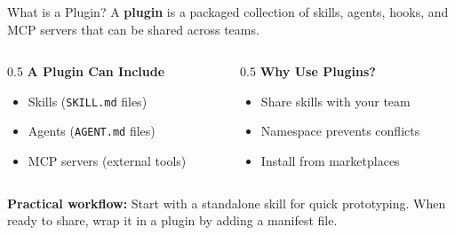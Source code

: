 \documentclass[aspectratio=169]{beamer}
\begin{document}
\begin{frame}{What is a Plugin?}
A \textbf{plugin} is a packaged collection of skills, agents, hooks, and MCP servers that can be shared across teams.
\vspace{0.3cm}
\begin{columns}[T]
\begin{column}{0.5\textwidth}
\textbf{A Plugin Can Include}
\begin{itemize}\small
  \item Skills (\texttt{SKILL.md} files)
  \item Agents (\texttt{AGENT.md} files)
  \item MCP servers (external tools)
\end{itemize}
\end{column}
\begin{column}{0.5\textwidth}
\textbf{Why Use Plugins?}
\begin{itemize}\small
  \item Share skills with your team
  \item Namespace prevents conflicts
  \item Install from marketplaces
\end{itemize}
\end{column}
\end{columns}
\vspace{0.3cm}
\textbf{Practical workflow:} Start with a standalone skill for quick prototyping. When ready to share, wrap it in a plugin by adding a manifest file.
\end{frame}
\end{document}
